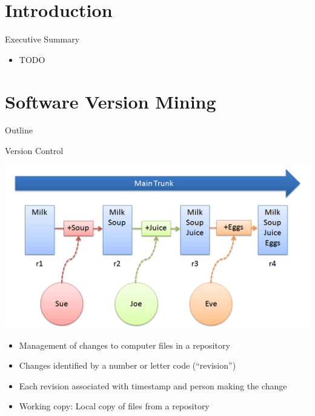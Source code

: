 \section*{Introduction}

\begin{frame}{Executive Summary}
  \begin{itemize}
  \item TODO
  \end{itemize}
\end{frame}



\section{Software Version Mining}


\begin{frame}{Outline}
  \tableofcontents[current]
\end{frame}


\begin{frame}{Version Control}
  \begin{center}
    \includegraphics[scale=0.35]{figures/vcs}
  \end{center}


  \begin{itemize}
  \item Management of changes to computer files in a repository
  \item Changes identified by a number or letter code (``revision'')
  \item Each revision associated with timestamp and person
    making the change
  \item Working copy: Local copy of files from a repository
  \end{itemize}
\end{frame}


